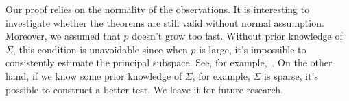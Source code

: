 \documentclass[12pt]{article} %
\newcommand{\bX}{\mathbf{X}}
\newcommand{\bJ}{\mathbf{J}}
\newcommand{\bC}{\mathbf{C}}
\theoremstyle{definition}
\begin{document}
Our proof relies on the normality of the observations.
It is interesting to investigate whether the theorems are still valid without normal assumption.
Moreover, we assumed that $p$ doesn't grow too fast.
 Without prior knowledge of $\Sigma$, this condition is unavoidable since when $p$ is large, it's impossible to consistently estimate the principal subspace.
See, for example,~\cite{Cai2012Sparse}.
On the other hand, if we know some prior knowledge of $\Sigma$, for example, $\Sigma$ is sparse, it's possible to construct a better test.
We leave it for future research.



%
\end{document}
